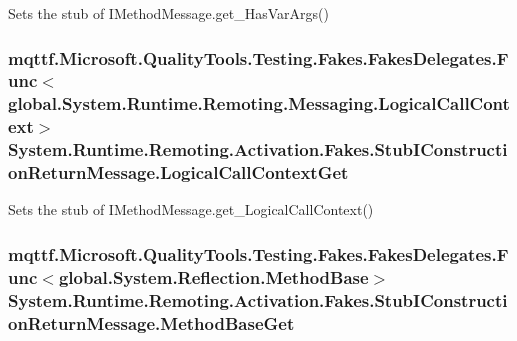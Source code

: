 Sets the stub of I\-Method\-Message.\-get\-\_\-\-Has\-Var\-Args()

\hypertarget{class_system_1_1_runtime_1_1_remoting_1_1_activation_1_1_fakes_1_1_stub_i_construction_return_message_a44d7510dd7d6464208c3ddb230f58649}{
\subsubsection[{Logical\-Call\-Context\-Get}]{\setlength{\rightskip}{0pt plus 5cm}mqttf.\-Microsoft.\-Quality\-Tools.\-Testing.\-Fakes.\-Fakes\-Delegates.\-Func$<$global.\-System.\-Runtime.\-Remoting.\-Messaging.\-Logical\-Call\-Context$>$ System.\-Runtime.\-Remoting.\-Activation.\-Fakes.\-Stub\-I\-Construction\-Return\-Message.\-Logical\-Call\-Context\-Get}}\label{class_system_1_1_runtime_1_1_remoting_1_1_activation_1_1_fakes_1_1_stub_i_construction_return_message_a44d7510dd7d6464208c3ddb230f58649}


Sets the stub of I\-Method\-Message.\-get\-\_\-\-Logical\-Call\-Context()

\hypertarget{class_system_1_1_runtime_1_1_remoting_1_1_activation_1_1_fakes_1_1_stub_i_construction_return_message_abca65021ab7cc75c05a51c53247b3bbe}{
\subsubsection[{Method\-Base\-Get}]{\setlength{\rightskip}{0pt plus 5cm}mqttf.\-Microsoft.\-Quality\-Tools.\-Testing.\-Fakes.\-Fakes\-Delegates.\-Func$<$global.\-System.\-Reflection.\-Method\-Base$>$ System.\-Runtime.\-Remoting.\-Activation.\-Fakes.\-Stub\-I\-Construction\-Return\-Message.\-Method\-Base\-Get}}\label{class_system_1_1_runtime_1_1_remoting_1_1_activation_1_1_fakes_1_1_stub_i_construction_return_message_abca65021ab7cc75c05a51c53247b3bbe}


